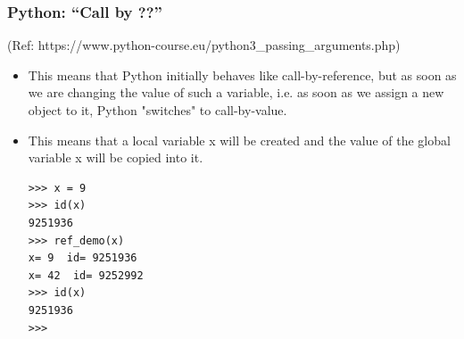 \begin{frame}[fragile]\frametitle{Python: ``Call by ??'' }
(Ref: https://www.python-course.eu/python3\_passing\_arguments.php)

    \begin{itemize}
    \item This means that Python initially behaves like call-by-reference, but as soon as we are changing the value of such a variable, i.e. as soon as we assign a new object to it, Python "switches" to call-by-value.
    \item This means that a local variable x will be created and the value of the global variable x will be copied into it. 
            \begin{lstlisting}
>>> x = 9
>>> id(x)
9251936
>>> ref_demo(x)
x= 9  id= 9251936
x= 42  id= 9252992
>>> id(x)
9251936
>>> 
\end{lstlisting}

            \end{itemize}
   \end{frame}
%
%
%
%
%
%
%
%
